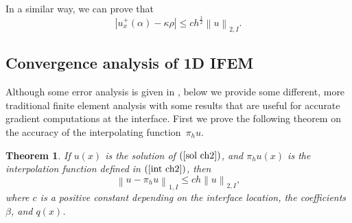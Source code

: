 \documentclass[11pt]{article}
\numberwithin{equation}{section}
\newtheorem{theorem}{Theorem}[section]
\begin{document}
In a similar way, we can prove that
\begin{equation*}
\left|u_{x}^{+}\left(\alpha\right)-\kappa\rho\right|\leq ch^{\frac{1}{2}}\left\|u\right\|_{2,I}.
\end{equation*}






\subsection{Convergence analysis of 1D IFEM}

Although some error analysis is given in \cite{li1998immersed},
below we provide some different,
more traditional finite element analysis with some results
that are useful for accurate gradient computations at the interface.
First we prove the following theorem on the accuracy of the interpolating function~$\pi_{h} u$.
\begin{theorem}{}
If $u\left(x\right)$ is the solution of $\left(\ref{sol ch2}\right)$,
and $\pi_{h}u\left(x\right)$ is the interpolation function defined in $\left(\ref{int ch2}\right)$, then
\begin{equation}\label{theo ch2}
\left\|u-\pi_{h} u\right\|_{1, I}\leq ch\left\|u\right\|_{2,I},
\end{equation}
where $c$ is a positive constant depending on the interface location,
the coefficients $\beta$, and $q(x)$.
\end{theorem}
\end{document}
